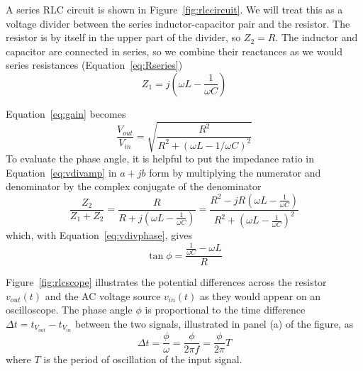 \documentclass[11pt]{article}
\begin{document}
A series RLC circuit is shown in Figure~\ref{fig:rlccircuit}. We will
treat this as a voltage divider between the series inductor-capacitor
pair and the resistor. The resistor is by itself in the upper part of
the divider, so $Z_2 = R$. The inductor and capacitor are connected in
series, so we combine their reactances as we would series resistances
(Equation~\ref{eq:Rseries})
\begin{equation}
  Z_1 = j \left( \omega L - \frac{1}{\omega C} \right)
\end{equation}

Equation~\ref{eq:gain} becomes
\begin{equation}
  \frac{V_{out}}{V_{in}} = \sqrt{\frac{R^2}{R^2 + (\omega L - 1/\omega C)^2}}
\end{equation}
To evaluate the phase angle, it is helpful to put the
impedance ratio in Equation~\ref{eq:vdivamp} in $a + jb$ form by
multiplying the numerator and denominator by the complex conjugate of
the denominator
\begin{equation}
  \frac{Z_2}{Z_1 + Z_2}
  = \frac{R}{R + j \left( \omega L - \frac{1}{\omega C} \right)}
  = \frac{R^2 - j R \left( \omega L - \frac{1}{\omega C} \right)}
         {R^2 + \left( \omega L - \frac{1}{\omega C} \right)^2}
\end{equation}
which, with Equation~\ref{eq:vdivphase}, gives
\begin{equation}
  \tan \phi = \frac{\frac{1}{\omega C} - \omega L}{R}
\end{equation}

Figure~\ref{fig:rlcscope} illustrates the
potential differences across the resistor $v_{out}(t)$ and the AC
voltage source $v_{in}(t)$ as they would appear on an oscilloscope. 
The phase angle $\phi$ is proportional to the time difference $\Delta t =
t_{V_{out}} - t_{V_{in}}$ between the two signals, illustrated in
panel (a) of the figure, as 
\begin{equation}
  \Delta t = \frac{\phi}{\omega} = \frac{\phi}{2 \pi f} = \frac{\phi}{2 \pi} T
  \label{eq:deltatphi}
\end{equation}
where $T$ is the period of oscillation of the input signal.
\end{document}
